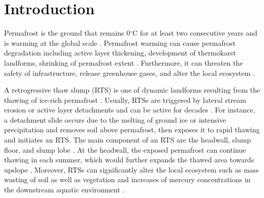 \documentclass[authoryear,preprint,review,12pt]{elsarticle}
\begin{document}

\section{Introduction}
\label{sec_intro}

Permafrost is the ground that remains 0$^\circ$C for at least two consecutive years and is warming at the global scale \citep{biskaborn2019permafrost}. 
Permafrost warming can cause permafrost degradation including active layer thickening, development of thermokarst landforms, shrinking of permafrost extent \citep{czudek_thermokarst_1970,jorgenson_response_2005,osterkamp2007Characteristics,aakerman2008thawing,zhao2010Thermal}. 
Furthermore, it can threaten the safety of infrastructure, release greenhouse gases, and alter the local ecosystem \citep{tong_effect_1996,yang2010permafrost,bowden2010climate,grosse_vulnerability_2011,vonk2015reviews,schuur_climate_2015,olefeldt_circumpolar_2016,schuster2018permafrost,hjort2018degrading}.


A retrogressive thaw slump (RTS) is one of dynamic landforms resulting from the thawing of ice-rich permafrost \citep{czudek_thermokarst_1970, jorgenson_thermokarst_2013,farquharson2016spatial,jones2019rapid}. 
Usually, RTSs are triggered by lateral stream erosion or active layer detachments \citep{french2017periglacial} and can be active for decades \citep{burn1989geomorphology, lacelle2010climatic, swanson2018growth}. 
For instance, a detachment slide occurs due to the melting of ground ice or intensive precipitation and removes soil above permafrost, then exposes it to rapid thawing and initiates an RTS. 
The main component of an RTS are the headwall, slump floor, and slump lobe \citep{lantuit_fifty_2008}. 
At the headwall, the exposed permafrost can continue thawing in each summer, which would further expands the thawed area towards upslope \citep{french2017periglacial}. 
Moreover, RTSs can significantly alter the local ecosystem such as mass wasting of soil as well as vegetation \citep{gooseff2009effects} and increases of mercury concentrations in the downstream aquatic environment \citep{pierre2018unprecedented}.
\end{document}

